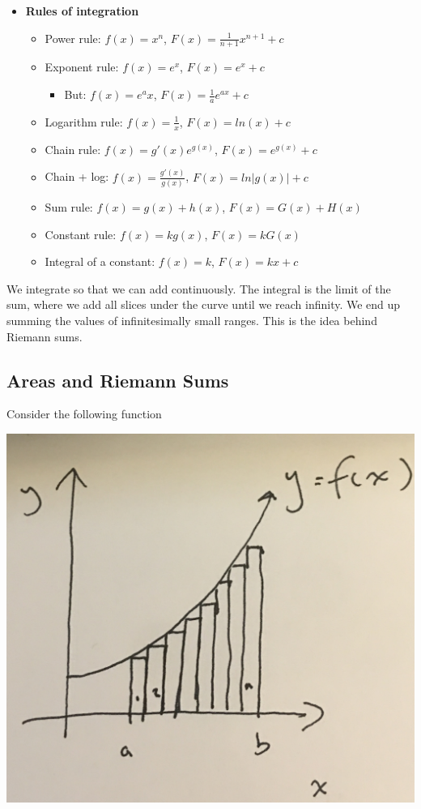 \begin{itemize}
    \item \textbf{Rules of integration}
    \begin{itemize}
        \item Power rule: $f(x) = x^n$, $F(x) = \frac{1}{n + 1} x^{n + 1} + c$
        \item Exponent rule: $f(x) = e^x$, $F(x) = e^x + c$
        \begin{itemize}
            \item But: $f(x) = e^ax$, $F(x) = \frac{1}{a}e^{ax} + c$
        \end{itemize}
        \item Logarithm rule: $f(x) = \frac{1}{x}$, $F(x) = ln(x) + c$
        \item Chain rule: $f(x) = g'(x)e^{g(x)}$, $F(x) = e^{g(x)} + c$
        \item Chain + log: $f(x) = \frac{g'(x)}{g(x)}$, $F(x) = ln|g(x)| + c$
        \item Sum rule: $f(x) = g(x) + h(x)$, $F(x) = G(x) + H(x)$
        \item Constant rule: $f(x) = kg(x)$, $F(x) = k G(x)$ 
        \item Integral of a constant: $f(x) = k$, $F(x) = kx + c$
    \end{itemize}
\end{itemize}

\noindent We integrate so that we can add continuously. The integral is the limit of the sum, where we add all slices under the curve until we reach infinity. We end up summing the values of infinitesimally small ranges. This is the idea behind Riemann sums.


\subsection{Areas and Riemann Sums}

Consider the following function

\begin{center}
    \includegraphics[scale = 0.075]{figures/riemann_ex.png}    
\end{center}

